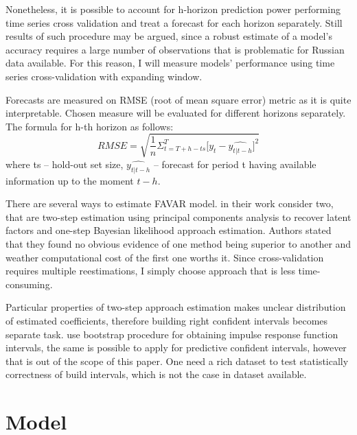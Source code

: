 \documentclass[a4paper, 14pt]{article}
\begin{document}
Nonetheless, it is possible to account for h-horizon prediction power performing time series cross validation and treat a forecast for each horizon separately. Still results of such procedure may be argued, since a robust estimate of a model's accuracy requires a large number of observations that is problematic for Russian data available. For this reason, I will measure models' performance using time series cross-validation with expanding window.

Forecasts are measured on RMSE (root of mean square error) metric
as it is quite interpretable. Chosen measure will be evaluated for different horizons separately. The formula for h-th horizon as follows:
\[
	RMSE = 
	\sqrt{
		\frac{1}{n}
		\Sigma_{t= T + h - ts}^{T}
			\Big[
			y_t - \widehat{y_{t|t-h}}
			\Big]^2}
\] where ts -- hold-out set size, $\widehat{y_{t|t-h}}$ -- forecast for period t having available information up to the moment $t-h$.


There are several ways to estimate FAVAR model. \cite{bernanke2005measuring} in their work consider two, that are two-step estimation using principal components analysis to recover latent factors and one-step Bayesian likelihood approach estimation. Authors stated that they found no obvious evidence of one method being superior to another and weather computational cost of the first one worths it. Since cross-validation requires multiple reestimations, I simply choose approach that is less time-consuming. 

Particular properties of two-step approach estimation makes unclear distribution of estimated coefficients, therefore building right confident intervals becomes separate task. \cite{bernanke2005measuring} use bootstrap procedure for obtaining impulse response function intervals, the same is possible to apply for predictive confident intervals, however that is out of the scope of this paper. One need a rich dataset to test statistically correctness of build intervals, which is not the case in dataset available.

\section{Model}
\end{document}
